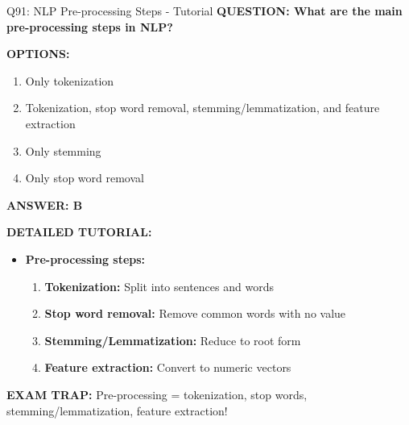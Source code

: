 \documentclass[8pt]{beamer}
\begin{document}
	\begin{frame}{Q91: NLP Pre-processing Steps - Tutorial}
		\fontsize{6.5}{7.5}\selectfont
		\textbf{QUESTION: What are the main pre-processing steps in NLP?}
		
		\vspace{0.1cm}
		\textbf{OPTIONS:}
		\begin{enumerate}
			\item Only tokenization
			\item Tokenization, stop word removal, stemming/lemmatization, and feature extraction
			\item Only stemming
			\item Only stop word removal
		\end{enumerate}
		
		\vspace{0.1cm}
		\textcolor{myblue}{\textbf{ANSWER: B}}
		
		\vspace{0.1cm}
		\textbf{DETAILED TUTORIAL:}
		\begin{itemize}
			\item \textbf{Pre-processing steps:}
			\begin{enumerate}
				\item \textbf{Tokenization:} Split into sentences and words
				\item \textbf{Stop word removal:} Remove common words with no value
				\item \textbf{Stemming/Lemmatization:} Reduce to root form
				\item \textbf{Feature extraction:} Convert to numeric vectors
			\end{enumerate}
		\end{itemize}
		
		\textcolor{myred}{\textbf{EXAM TRAP:}} Pre-processing = \textcolor{myblue}{tokenization, stop words, stemming/lemmatization, feature extraction}!
	\end{frame}
	
\end{document}
